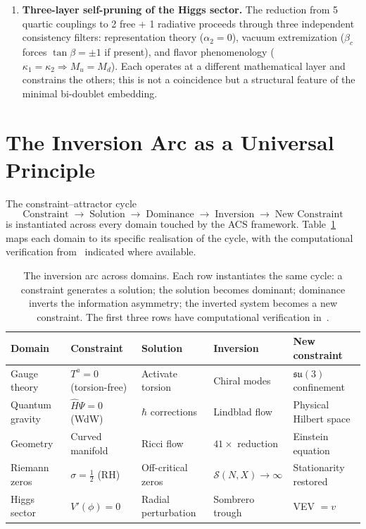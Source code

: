 \documentclass[11pt,a4paper]{article}
\theoremstyle{plain}
\theoremstyle{definition}
\theoremstyle{remark}
\begin{document}
\begin{enumerate}[label=(\arabic*)]
  \item \textbf{Three-layer self-pruning of the Higgs sector.}
    The reduction from 5 quartic couplings to 2 free + 1 radiative
    proceeds through three independent consistency filters: representation
    theory ($\alpha_2 = 0$), vacuum extremization ($\beta_c$ forces
    $\tan\beta = \pm 1$ if present), and flavor phenomenology
    ($\kappa_1 = \kappa_2 \Rightarrow M_u = M_d$).  Each operates at a
    different mathematical layer and constrains the others; this is
    not a coincidence but a structural feature of the minimal
    bi-doublet embedding.
\end{enumerate}

\section{The Inversion Arc as a Universal Principle}
\label{sec:universal}

The constraint--attractor cycle
\[
  \text{Constraint} \;\to\; \text{Solution} \;\to\;
  \text{Dominance} \;\to\; \text{Inversion} \;\to\;
  \text{New Constraint}
\]
is instantiated across every domain touched by the ACS framework.
Table~\ref{tab:inversion-universal} maps each domain to its specific
realisation of the cycle, with the computational verification
from~\cite{Wallace2026a} indicated where available.

\begin{table}[h]
\centering\small
\begin{tabular}{@{}lllll@{}}
\toprule
Domain & Constraint & Solution & Inversion & New constraint \\
\midrule
Gauge theory & $T^a = 0$ (torsion-free) & Activate torsion &
  Chiral modes & $\mathfrak{su}(3)$ confinement \\
Quantum gravity & $\hat{H}\Psi = 0$ (WdW) & $\hbar$ corrections &
  Lindblad flow & Physical Hilbert space \\
Geometry & Curved manifold & Ricci flow & $41\times$ reduction &
  Einstein equation \\
Riemann zeros & $\sigma = \tfrac{1}{2}$ (RH) & Off-critical zeros &
  $\mathcal{S}(N,X) \to \infty$ & Stationarity restored \\
Higgs sector & $V'(\phi) = 0$ & Radial perturbation &
  Sombrero trough & VEV $= v$ \\
\bottomrule
\end{tabular}
\caption{The inversion arc across domains.  Each row instantiates the
same cycle: a constraint generates a solution; the solution becomes
dominant; dominance inverts the information asymmetry; the inverted
system becomes a new constraint.  The first three rows have
computational verification in~\cite{Wallace2026a}.}
\label{tab:inversion-universal}
\end{table}
\end{document}
